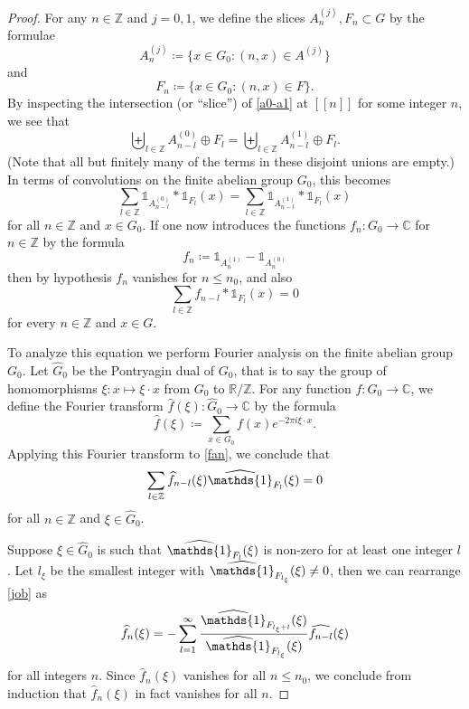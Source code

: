 \documentclass[reqno,a4paper,12pt]{amsart}
\numberwithin{equation}{section}
\numberwithin{figure}{section}
\def\R{\mathbb{R}}
\def\C{\mathbb{C}}
\def\Z{\mathbb{Z}}
\def\one{\mathds{1}}
\renewcommand\leq{\leqslant}
\renewcommand\hat{\widehat}
\newcommand{\ft}[1]{\widehat #1}
\theoremstyle{plain}
\theoremstyle{definition}
\begin{document}
\begin{proof}  
For any $n \in \Z$ and $j=0,1$, we define the slices $A^{(j)}_n, F_n \subset G$ by the formulae
$$ A^{(j)}_n \coloneqq \{ x \in G_0: (n,x) \in A^{(j)} \}$$
and
$$ F_n \coloneqq \{ x \in G_0: (n,x) \in F \}.$$
By inspecting the intersection (or ``slice'') of \eqref{a0-a1} at $[[n]]$ for some integer $n$, we see that
$$
\biguplus_{l \in \Z} A^{(0)}_{n-l} \oplus F_l =  \biguplus_{l \in \Z} A^{(1)}_{n-l} \oplus F_l.
$$
(Note that all but finitely many of the terms in these disjoint unions are empty.)
In terms of convolutions on the finite abelian group $G_0$, this becomes
$$
\sum_{l \in \Z} \one_{A^{(0)}_{n-l}} * \one_{F_l}(x) =  \sum_{l \in \Z} \one_{A^{(1)}_{n-l}} * \one_{F_l}(x)
$$
for all $n \in \Z$ and $x \in G_0$.
If one now introduces the functions $f_n \colon G_0 \to \C$ for $n \in \Z$ by the formula
$$ f_n \coloneqq \one_{A^{(1)}_n} - \one_{A^{(0)}_n}$$
then by hypothesis $f_n$ vanishes for $n \leq n_0$, and also
\begin{equation}\label{fan}
\sum_{l \in \Z} f_{n-l} * \one_{F_l}(x) = 0
\end{equation}
for every $n \in \Z$ and $x \in G$.  

To analyze this equation we perform Fourier analysis on the finite abelian group $G_0$.  Let $\hat G_0$ be the Pontryagin dual of $G_0$, that is to say the group of homomorphisms $\xi \colon x \mapsto \xi \cdot x$ from $G_0$ to $\R/\Z$.  For any function $f \colon G_0 \to \C$, we define the Fourier transform $\hat f(\xi) \colon \hat G_0 \to \C$ by the formula
$$ \ft{f}(\xi) \coloneqq \sum_{x \in G_0} f(x) e^{-2\pi i \xi\cdot x}.$$
Applying this Fourier transform to \eqref{fan}, we conclude that
\begin{equation}\label{job}
 \sum_{l \in \Z} \ft{f_{n-l}}(\xi) \ft{\one_{F_l}}(\xi) = 0
 \end{equation}
for all $n \in \Z$ and $\xi \in \hat G_0$.

Suppose $\xi \in \hat G_0$ is such that $\ft{\one_{F_l}}(\xi)$ is non-zero for at least one integer $l$.  Let $l_\xi$ be the smallest integer with $\ft{\one_{F_{l_\xi}}}(\xi) \neq 0$, then we can rearrange \eqref{job} as
$$ \ft{f_n}(\xi) = -  \sum_{l=1}^\infty \frac{\ft{\one_{F_{l_\xi+l}}}(\xi)}{\ft{\one_{F_{l_\xi}}}(\xi)} \hat{f_{n-l}}(\xi)$$
for all integers $n$.  Since $\ft{f_n}(\xi)$ vanishes for all $n \leq n_0$, we conclude from induction that $\ft{f_n}(\xi)$ in fact vanishes for all $n$.


\end{proof}
\end{document}
